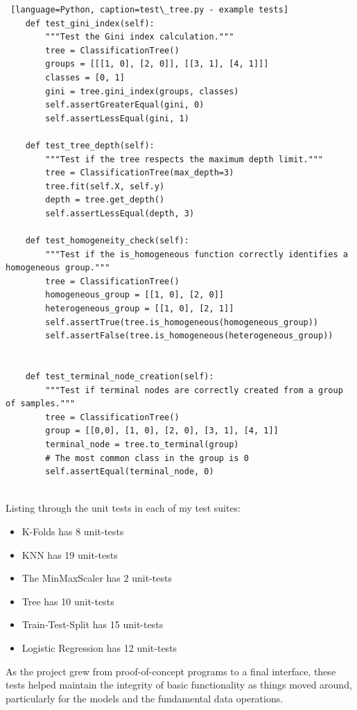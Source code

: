 \documentclass[letterpaper,10pt]{article}
\begin{document}
\begin{lstlisting} [language=Python, caption=test\_tree.py - example tests]
    def test_gini_index(self):
        """Test the Gini index calculation."""
        tree = ClassificationTree()
        groups = [[[1, 0], [2, 0]], [[3, 1], [4, 1]]]
        classes = [0, 1]
        gini = tree.gini_index(groups, classes)
        self.assertGreaterEqual(gini, 0)
        self.assertLessEqual(gini, 1)
    
    def test_tree_depth(self):
        """Test if the tree respects the maximum depth limit."""
        tree = ClassificationTree(max_depth=3)
        tree.fit(self.X, self.y)
        depth = tree.get_depth()
        self.assertLessEqual(depth, 3)

    def test_homogeneity_check(self):
        """Test if the is_homogeneous function correctly identifies a homogeneous group."""
        tree = ClassificationTree()
        homogeneous_group = [[1, 0], [2, 0]]
        heterogeneous_group = [[1, 0], [2, 1]]
        self.assertTrue(tree.is_homogeneous(homogeneous_group))
        self.assertFalse(tree.is_homogeneous(heterogeneous_group))


    def test_terminal_node_creation(self):
        """Test if terminal nodes are correctly created from a group of samples."""
        tree = ClassificationTree()
        group = [[0,0], [1, 0], [2, 0], [3, 1], [4, 1]]
        terminal_node = tree.to_terminal(group)
        # The most common class in the group is 0
        self.assertEqual(terminal_node, 0)
      
\end{lstlisting}

Listing through the unit tests in each of my test suites:
\begin{itemize}
    \item K-Folds has 8 unit-tests
    \item KNN has 19 unit-tests
    \item The MinMaxScaler has 2 unit-tests
    \item Tree has 10 unit-tests
    \item Train-Test-Split has 15 unit-tests
    \item Logistic Regression has 12 unit-tests
\end{itemize}

As the project grew from proof-of-concept programs to a final interface, these tests helped maintain the integrity of basic functionality as things moved around, particularly for the models and the fundamental data operations. \par
\end{document}
